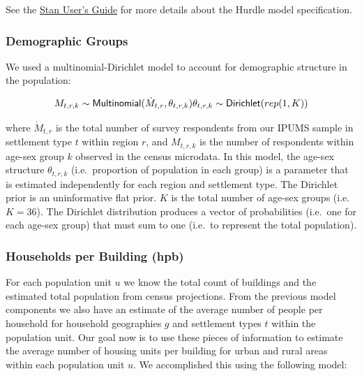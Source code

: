\documentclass[]{book}
\begin{document}
See the
\href{https://mc-stan.org/docs/2_23/stan-users-guide/zero-inflated-section.html}{Stan
User's Guide} \citep{stan2019stan} for more details about the Hurdle
model specification.

\subsubsection*{Demographic Groups}\label{demographic-groups}

We used a multinomial-Dirichlet model to account for demographic
structure in the population:

\begin{equation}
M_{t,r,k} \sim \textsf{Multinomial}(\dot{M}_{t,r}, \theta_{t,r,k}) \\
\theta_{t,r,k} \sim \textsf{Dirichlet}(rep(1, K))
\end{equation}

where \(\dot{M}_{t,r}\) is the total number of survey respondents from
our IPUMS sample in settlement type \(t\) within region \(r\), and
\(M_{t,r,k}\) is the number of respondents within age-sex group \(k\)
observed in the census microdata. In this model, the age-sex structure
\(\theta_{t,r,k}\) (i.e.~proportion of population in each group) is a
parameter that is estimated independently for each region and settlement
type. The Dirichlet prior is an uninformative flat prior. \(K\) is the
total number of age-sex groups (i.e. \(K = 36\)). The Dirichlet
distribution produces a vector of probabilities (i.e.~one for each
age-sex group) that must sum to one (i.e.~to represent the total
population).

\subsubsection*{Households per Building
(hpb)}\label{households-per-building-hpb}

For each population unit \(u\) we know the total count of buildings and
the estimated total population from census projections. From the
previous model components we also have an estimate of the average number
of people per household for household geographies \(g\) and settlement
types \(t\) within the population unit. Our goal now is to use these
pieces of information to estimate the average number of housing units
per building for urban and rural areas within each population unit
\(u\). We accomplished this using the following model:
\end{document}
